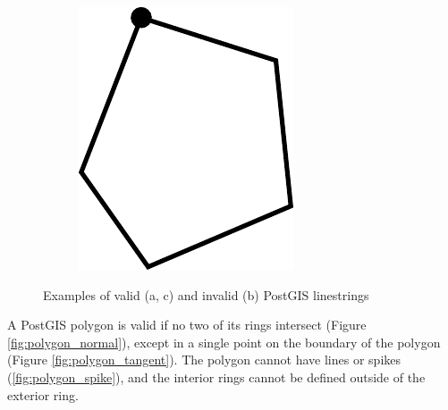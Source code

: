 \begin{figure}[h!]
\begin{subfigure}{.3\textwidth}
  \centering
  \includegraphics[width=.7\linewidth]{images/linestring_closed.pdf}
  \caption{}
  \label{fig:linestring_closed}
\end{subfigure}
\caption[Examples of valid and invalid PostGIS linestrings]{Examples of valid (a, c) and invalid (b) PostGIS linestrings}
\label{fig:postgis_linestring}
\end{figure}

A PostGIS polygon is valid if no two of its rings intersect (Figure \ref{fig:polygon_normal}), except in a single point on the boundary of the polygon (Figure \ref{fig:polygon_tangent}). The polygon cannot have lines or spikes (\ref{fig:polygon_spike}), and the interior rings cannot be defined outside of the exterior ring.

